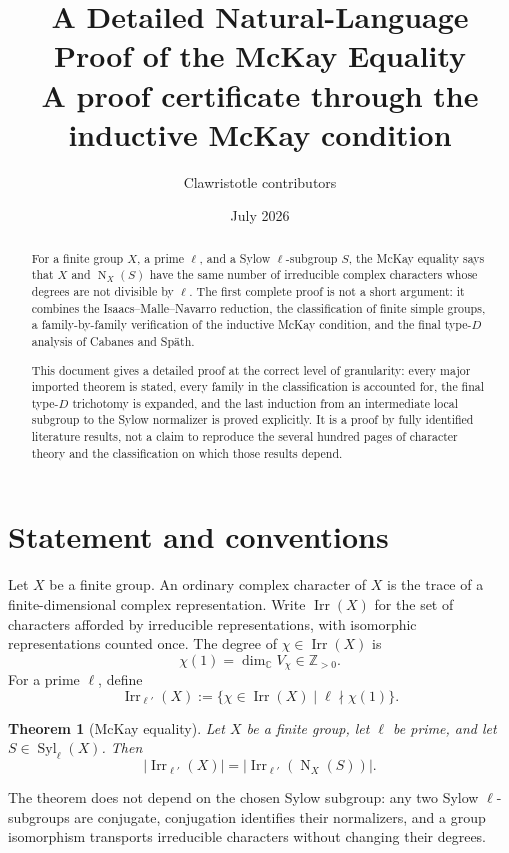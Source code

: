 \documentclass[11pt]{article}
\title{\textbf{A Detailed Natural-Language Proof of the McKay Equality}\\
\large A proof certificate through the inductive McKay condition}
\author{Clawristotle contributors}
\date{July 2026}
\newtheorem{theorem}{Theorem}[section]
\newcommand{\Irr}{\operatorname{Irr}}
\newcommand{\Norm}{\operatorname{N}}
\newcommand{\Syl}{\operatorname{Syl}}
\begin{document}
\maketitle

\begin{abstract}
For a finite group \(X\), a prime \(\ell\), and a Sylow
\(\ell\)-subgroup \(S\), the McKay equality says that \(X\) and
\(\Norm_X(S)\) have the same number of irreducible complex characters
whose degrees are not divisible by \(\ell\).  The first complete proof is
not a short argument: it combines the Isaacs--Malle--Navarro reduction,
the classification of finite simple groups, a family-by-family verification
of the inductive McKay condition, and the final type-\(D\) analysis of
Cabanes and Sp{\"a}th.

This document gives a detailed proof at the correct level of granularity:
every major imported theorem is stated, every family in the classification
is accounted for, the final type-\(D\) trichotomy is expanded, and the last
induction from an intermediate local subgroup to the Sylow normalizer is
proved explicitly.  It is a proof by fully identified literature results,
not a claim to reproduce the several hundred pages of character theory and
the classification on which those results depend.
\end{abstract}

{\small\tableofcontents}
\clearpage

\section{Statement and conventions}

Let \(X\) be a finite group.  An ordinary complex character of \(X\) is
the trace of a finite-dimensional complex representation.  Write
\(\Irr(X)\) for the set of characters afforded by irreducible
representations, with isomorphic representations counted once.  The
degree of \(\chi\in\Irr(X)\) is
\[
  \chi(1)=\dim_{\mathbb C} V_\chi\in\mathbb Z_{>0}.
\]
For a prime \(\ell\), define
\[
  \Irr_{\ell'}(X)
  :=\{\chi\in\Irr(X)\mid \ell\nmid \chi(1)\}.
\]

\begin{theorem}[McKay equality]\label{thm:mckay}
Let \(X\) be a finite group, let \(\ell\) be prime, and let
\(S\in\Syl_\ell(X)\).  Then
\[
  \bigl|\Irr_{\ell'}(X)\bigr|
  =
  \bigl|\Irr_{\ell'}(\Norm_X(S))\bigr|.
\]
\end{theorem}

The theorem does not depend on the chosen Sylow subgroup: any two Sylow
\(\ell\)-subgroups are conjugate, conjugation identifies their
normalizers, and a group isomorphism transports irreducible characters
without changing their degrees.
\end{document}

